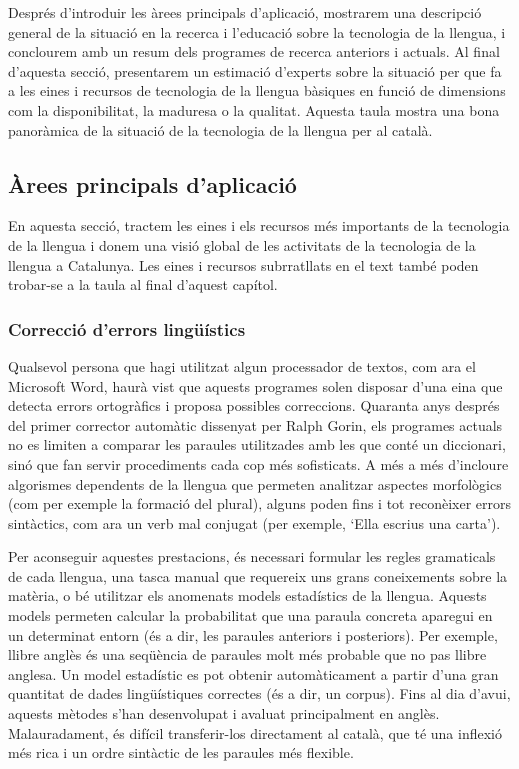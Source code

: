 \documentclass[]{../../metanetpaper}
\begin{document}
\begin{multicols}{2}
Després d’introduir les àrees principals d’aplicació, mostrarem una descripció general de la situació en la recerca i l’educació sobre la tecnologia de la llengua, i conclourem amb un resum dels programes de recerca anteriors i actuals. Al final d’aquesta secció, presentarem un estimació d’experts sobre la situació per que fa a les eines i recursos de tecnologia de la llengua bàsiques en funció de dimensions com la disponibilitat, la maduresa o la qualitat. Aquesta taula mostra una bona panoràmica de la situació de la tecnologia de la llengua per al català.  

\subsection{Àrees principals d’aplicació} 

 En aquesta secció, tractem les eines i els recursos més importants de la tecnologia de la llengua i 
  donem una visió global de les activitats de la tecnologia de la llengua a Catalunya. Les eines i recursos subrratllats en el text també poden trobar-se a la taula al final d'aquest capítol.

\subsubsection{Correcció d’errors lingüístics}

Qualsevol persona que hagi utilitzat algun processador de textos, com ara el Microsoft Word, haurà vist que aquests programes solen disposar d’una eina que detecta errors ortogràfics i proposa possibles correccions. Quaranta anys després del primer corrector automàtic dissenyat per Ralph Gorin, els programes actuals no es limiten a comparar les paraules utilitzades amb les que conté un diccionari, sinó que fan servir procediments cada cop més sofisticats. A més a més d’incloure algorismes dependents de la llengua que permeten analitzar aspectes morfològics (com per exemple la formació del plural), alguns poden fins i tot reconèixer errors sintàctics, com ara un verb mal conjugat (per exemple, ‘Ella escrius una carta’).

Per aconseguir aquestes prestacions, és necessari formular les regles gramaticals de cada llengua, una tasca manual que requereix uns grans coneixements sobre la matèria, o bé utilitzar els anomenats models estadístics de la llengua. Aquests models permeten calcular la probabilitat que una paraula concreta aparegui en un determinat entorn (és a dir, les paraules anteriors i posteriors). Per exemple, llibre anglès és una seqüència de paraules molt més probable que no pas llibre anglesa. Un model estadístic es pot obtenir automàticament a partir d’una gran quantitat de dades lingüístiques correctes (és a dir, un corpus). Fins al dia d’avui, aquests mètodes s’han desenvolupat i avaluat principalment en anglès. Malauradament, és difícil transferir-los directament al català, que té una inflexió més rica i un ordre sintàctic de les paraules més flexible.


\end{multicols}
\end{document}
